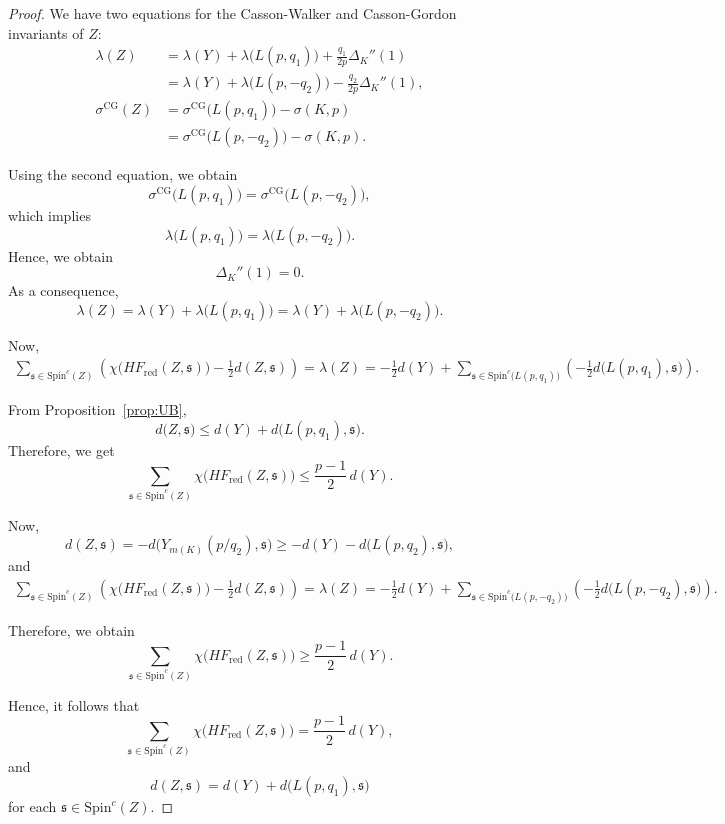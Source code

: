 \documentclass[10pt,a4paper]{amsart}
\newcommand{\HF}{HF}
\newcommand{\Spin}{\text{Spin}}
\newcommand{\din}{d}
\begin{document}
\begin{proof}
   We have two equations for the Casson-Walker and Casson-Gordon invariants of \(Z\):
\[
\begin{aligned}
\lambda(Z)
&= \lambda(Y)+\lambda\bigl(L(p,q_1)\bigr)+\frac{q_1}{2p}\Delta_K''(1) \\
&= \lambda(Y)+\lambda\bigl(L(p,-q_2)\bigr)-\frac{q_2}{2p}\Delta_K''(1), \\
\sigma^{\mathrm{CG}}(Z)
&= \sigma^{\mathrm{CG}}\bigl(L(p,q_1)\bigr)-\sigma(K,p) \\
&= \sigma^{\mathrm{CG}}\bigl(L(p,-q_2)\bigr)-\sigma(K,p).
\end{aligned}
\]

Using the second equation, we obtain
\[
\sigma^{\mathrm{CG}}\bigl(L(p,q_1)\bigr)=\sigma^{\mathrm{CG}}\bigl(L(p,-q_2)\bigr),
\]
which implies
\[
\lambda\bigl(L(p,q_1)\bigr)=\lambda\bigl(L(p,-q_2)\bigr).
\]
Hence, we obtain
\[
\Delta_K''(1)=0.
\]
As a consequence,
\[
\lambda(Z)=\lambda(Y)+\lambda\bigl(L(p,q_1)\bigr)=\lambda(Y)+\lambda\bigl(L(p,-q_2)\bigr).
\]

Now,
\[
\begin{aligned}
\sum_{\mathfrak{s} \in \Spin^c(Z)}
\left(
\chi\bigl(\HF_{\mathrm{red}}(Z,\mathfrak{s})\bigr)
-\frac{1}{2}d(Z,\mathfrak{s})
\right)
= \lambda(Z) 
= -\frac{1}{2}\din(Y)
+ \sum_{\mathfrak{s} \in \Spin^c\!\bigl(L(p,q_1)\bigr)}
\left(-\frac{1}{2}d\bigl(L(p,q_1),\mathfrak{s}\bigr)\right).
\end{aligned}
\]

From Proposition~\ref{prop:UB},
\[
\din\bigl(Z,\mathfrak{s}\bigr)
\le \din(Y)+\din\bigl(L(p,q_1),\mathfrak{s}\bigr).
\]
Therefore, we get
\[
\sum_{\mathfrak{s} \in \Spin^c(Z)}
\chi\bigl(\HF_{\mathrm{red}}(Z,\mathfrak{s})\bigr)
\le \frac{p-1}{2}\,\din(Y).
\]

Now,
\[
\din(Z,\mathfrak{s})
= -\din\bigl(Y_{m(K)}(p/q_2),\mathfrak{s}\bigr)
\ge -\din(Y)-\din\bigl(L(p,q_2),\mathfrak{s}\bigr),
\]
and
\[
\begin{aligned}
\sum_{\mathfrak{s} \in \Spin^c(Z)}
\left(
\chi\bigl(\HF_{\mathrm{red}}(Z,\mathfrak{s})\bigr)
-\frac{1}{2}d(Z,\mathfrak{s})
\right)
= \lambda(Z) 
= -\frac{1}{2}\din(Y)
+ \sum_{\mathfrak{s} \in \Spin^c\!\bigl(L(p,-q_2)\bigr)}
\left(-\frac{1}{2}d\bigl(L(p,-q_2),\mathfrak{s}\bigr)\right).
\end{aligned}
\]

Therefore, we obtain
\[
\sum_{\mathfrak{s} \in \Spin^c(Z)}
\chi\bigl(\HF_{\mathrm{red}}(Z,\mathfrak{s})\bigr)
\ge \frac{p-1}{2}\,\din(Y).
\]

Hence, it follows that
\[
\sum_{\mathfrak{s} \in \Spin^c(Z)}
\chi\bigl(\HF_{\mathrm{red}}(Z,\mathfrak{s})\bigr)
= \frac{p-1}{2}\,\din(Y),
\]
and
\[
\din(Z,\mathfrak{s})
= \din(Y)+\din\bigl(L(p,q_1),\mathfrak{s}\bigr)
\]
for each \(\mathfrak{s} \in \Spin^c(Z)\).

\end{proof}
\end{document}
